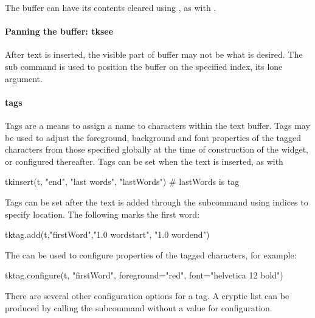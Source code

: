 The buffer can have its contents cleared using , as
with .

\paragraph{Panning the buffer: tksee}
After text is inserted, the visible part of buffer may not be what is
desired. The  sub command is used to position
the buffer on the specified index, its lone argument.


\paragraph{tags}
Tags are a means to assign a name to characters within the text buffer. Tags may be used to adjust the 
foreground, background and font properties of the tagged characters from those specified globally at the time of construction of the widget, or configured thereafter. Tags can be set when the text is inserted, as with
\begin{Schunk}
\begin{Sinput}
 tkinsert(t, "end", "last words", "lastWords") # lastWords is tag
\end{Sinput}
\end{Schunk}

Tags can be set after the text is added through the
 subcommand using indices to specify
location. The following marks the first word:
\begin{Schunk}
\begin{Sinput}
 tktag.add(t,"firstWord","1.0 wordstart", "1.0 wordend")
\end{Sinput}
\end{Schunk}
The  can be used to configure properties of the tagged characters, for example:
\begin{Schunk}
\begin{Sinput}
 tktag.configure(t, "firstWord", foreground="red", 
                 font="helvetica 12 bold")
\end{Sinput}
\end{Schunk}
There are several other configuration options for a tag. A cryptic list can be produced by calling the subcommand  without a value for configuration.


